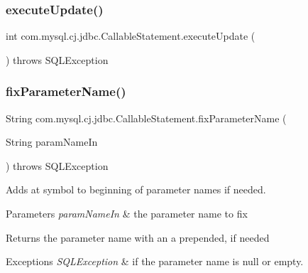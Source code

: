 \subsubsection{\texorpdfstring{execute\+Update()}{executeUpdate()}}
{\footnotesize\ttfamily int com.\+mysql.\+cj.\+jdbc.\+Callable\+Statement.\+execute\+Update (\begin{DoxyParamCaption}{ }\end{DoxyParamCaption}) throws S\+Q\+L\+Exception}

\mbox{\label{classcom_1_1mysql_1_1cj_1_1jdbc_1_1_callable_statement_a1ef44aef1842ec7c4affb25b0baba1d7}} 
\subsubsection{\texorpdfstring{fix\+Parameter\+Name()}{fixParameterName()}}
{\footnotesize\ttfamily String com.\+mysql.\+cj.\+jdbc.\+Callable\+Statement.\+fix\+Parameter\+Name (\begin{DoxyParamCaption}\item[{String}]{param\+Name\+In }\end{DoxyParamCaption}) throws S\+Q\+L\+Exception\hspace{0.3cm}{\ttfamily [protected]}}

Adds \textquotesingle{}at\textquotesingle{} symbol to beginning of parameter names if needed.


\begin{DoxyParams}{Parameters}
{\em param\+Name\+In} & the parameter name to \textquotesingle{}fix\textquotesingle{}\\
\hline
\end{DoxyParams}
\begin{DoxyReturn}{Returns}
the parameter name with an \textquotesingle{}a\textquotesingle{} prepended, if needed
\end{DoxyReturn}

\begin{DoxyExceptions}{Exceptions}
{\em S\+Q\+L\+Exception} & if the parameter name is null or empty. \\
\hline
\end{DoxyExceptions}
\mbox{\label{classcom_1_1mysql_1_1cj_1_1jdbc_1_1_callable_statement_abbdda7be3e842e71327e8ea392f7a5ed}} 
